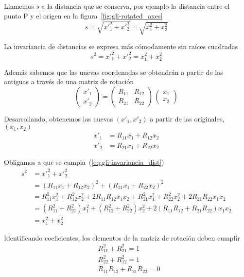 Llamemos $s$ a la distancia que se conserva, por ejemplo la distancia entre el punto P y el origen en la figura~\eqref{fig:gli-rotated_axes}
\[
  s = \sqrt{x'^2_1 + x'^2_2}
  = \sqrt{x^2_1 + x^2_2}
\]

La invariancia de distancias se expresa más cómodamente sin raíces cuadradas
\begin{equation}
  \label{eq:gli-invariancia_dist}
  s^2 = x'^2_1 + x'^2_2
  = x^2_1 + x^2_2
\end{equation}

Además sabemos que las nuevas coordenadas se obtendrán a partir de las antiguas a través de una matriz de rotación
\[
  \begin{pmatrix}
    x'_1 \\ x'_2
  \end{pmatrix}
  =
  \begin{pmatrix}
    R_{11} & R_{12}\\
    R_{21} & R_{22}
  \end{pmatrix}
  \,
  \begin{pmatrix}
    x_1 \\ x_2
  \end{pmatrix}
\]

Desarrollando, obtenemos las nuevas $(x'_1,x'_2)$ a partir de las originales, $(x_1,x_2)$
\begin{align*}
  x'_1 &= R_{11} x_1 + R_{12} x_2\\
  x'_2 &= R_{21} x_1 + R_{22} x_2
\end{align*}

Obligamos a que se cumpla~(\ref{eq:gli-invariancia_dist})
\begin{align*}
  s^2 &= x'^2_1 + x'^2_2\\
      &= (R_{11} x_1 + R_{12} x_2)^2 + (R_{21} x_1 + R_{22} x_2)^2\\
      &= R^2_{11} x^2_1 + R^2_{12} x^2_2 + 2 R_{11} R_{12} x_1 x_2
        + R^2_{21} x^2_1 + R^2_{22} x^2_2 + 2 R_{21} R_{22} x_1 x_2\\
      &= (R^2_{11} + R^2_{21}) x^2_1 + (R^2_{12} + R^2_{22}) x^2_2
        + 2 (R_{11} R_{12} + R_{21} R_{22}) x_1 x_2\\
      &= x^2_1 + x^2_2
\end{align*}

Identificando coeficientes, los elementos de la matriz de rotación deben cumplir
\begin{align*}
  &R^2_{11} + R^2_{21} = 1\\
  &R^2_{22} + R^2_{12} = 1\\
  & R_{11} R_{12} + R_{21} R_{22} = 0
\end{align*}

